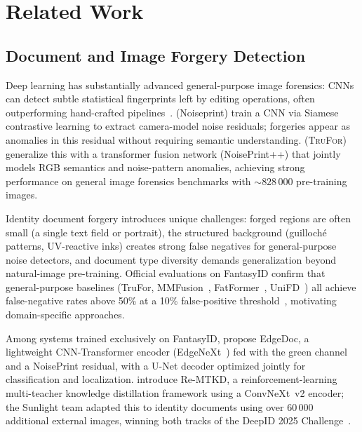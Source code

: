 
\section{Related Work}
\label{sec:related}

\subsection{Document and Image Forgery Detection}

Deep learning has substantially advanced general-purpose image forensics:
CNNs can detect subtle statistical fingerprints left by editing operations,
often outperforming hand-crafted pipelines~\citep{mantranet2019}.
\citet{cozzolino2020noiseprint} (Noiseprint) train a CNN via Siamese
contrastive learning to extract camera-model noise residuals; forgeries appear
as anomalies in this residual without requiring semantic understanding.
\citet{trufor2023} (\textsc{TruFor}) generalize this with a transformer fusion
network (NoisePrint++) that jointly models RGB semantics and noise-pattern
anomalies, achieving strong performance on general image forensics benchmarks
with ${\sim}828\,000$ pre-training images. 

Identity document forgery introduces unique challenges: forged regions are
often small (a single text field or portrait), the structured background
(guilloché patterns, UV-reactive inks) creates strong false negatives for
general-purpose noise detectors, and document type diversity demands
generalization beyond natural-image pre-training. Official evaluations on
FantasyID confirm that general-purpose baselines (TruFor, MMFusion~\citep{mmfusion2024},
FatFormer~\citep{fatformer2024}, UniFD~\citep{unifd2023}) all achieve
false-negative rates above 50\% at a 10\% false-positive
threshold~\citep{fantasyid2024}, motivating domain-specific approaches.

Among systems trained exclusively on FantasyID, \citet{edgedoc2025} propose
EdgeDoc, a lightweight CNN-Transformer encoder (EdgeNeXt~\citep{edgenext2022}) fed with the green
channel and a NoisePrint residual, with a U-Net decoder optimized jointly for
classification and localization. \citet{remtkd2025} introduce Re-MTKD, a
reinforcement-learning multi-teacher knowledge distillation framework using a
ConvNeXt~v2 encoder; the Sunlight team adapted this to identity documents using
over 60\,000 additional external images, winning both tracks of the DeepID
2025 Challenge~\citep{deepid2025challenge}.

